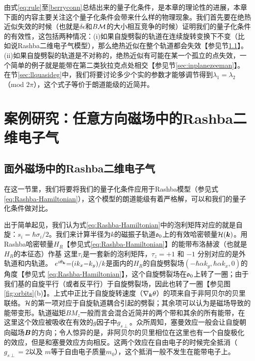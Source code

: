 由式\ref{eq:rule}至\ref{berryconn}总结出来的量子化条件，是本章的理论性的进展，本章下面的内容主要关注这个量子化条件会带来什么样的物理现象。我们首先要在绝热近似失效的时候（也就是$\delta \epsilon$和$B{\cal M}$的大小相互竞争的时候）证明我们的量子化条件的有效性，这包括两种情况：(i)如果自旋劈裂的轨道在连续旋转变换下不变（比如说Rashba二维电子气模型），那么绝热近似在整个轨道都会失效【参见节\ref{sec:Rashba}】。(ii)如果自旋劈裂的轨道是不对称的，绝热近似有可能在某一个孤立的点失效，一个简单的例子就是能带在第二类狄拉克点处相交【参见节\ref{sec:inplanezeeman}】。在节\ref{sec:llquasideg}中，我们将要讨论多少个实的参数才能够调节得到$\lambda_1{=}\lambda_2$（mod $2\pi$），这个式子等价于朗道能级的近简并。


\section{案例研究：任意方向磁场中的Rashba二维电子气}

\subsection{面外磁场中的Rashba二维电子气}\label{sec:Rashba}

在这一节里，我们将要将我们的量子化条件应用于Rashba模型（参见式\ref{eq:Rashba-Hamiltonian}），这个模型的朗道能级有着严格解，可以和我们的量子化条件做对比\cite{bychkov_oscillatory_1984}。

出于简单起见，我们认为式\ref{eq:Rashba-Hamiltonian}中的泡利矩阵对应的就是自旋：$s_i{=}\hbar \sigma_i/2$。我们来计算半径为$k$的磁振子轨道$\mathfrak{o}_0$上的有效哈密顿量${\cal H}(\boldsymbol{k})$。用Rashba哈密顿量$H_R$【参见式\ref{eq:Rashba-Hamiltonian}】的能带布洛赫波（也就是$H_R$的本征态）作基
这里$\tau_i$是一套新的泡利矩阵，$\tau_z{=}{+} 1$ 和 ${-}1$ 分别对应的是外轨道和内轨道。 $e^{i\theta_{\boldsymbol{k}}}{=}(ik_x{-}k_y)/k$是面内的$H_R$的自旋劈裂场$(-\hbar\alpha k_y,\hbar\alpha k_x,0)$的角度【参见式 \ref{eq:Rashba-Hamiltonian}】，这个自旋劈裂场在$\mathfrak{o}_0$上转了一圈；由于我们基的自旋平行（或者反平行）于自旋劈裂场，因此也转了一圈【参见图\ref{fig:orbits}(b)】。上式中正比于自旋旋转速度（$\nabla_{\boldsymbol{k}} \theta$）的项来自于非阿贝尔的贝里联络。${\cal H}$的第一项对应于自旋轨道耦合引起的劈裂；其余项可以认为是磁场导致的能带变形。轨道磁矩$B M_z$一般而言会混合近简并的两个带和其余的所有能带，在这里这个效应被吸收在有效的$g$因子中$g_{s\perp}$。众所周知，塞曼效应一般会让自旋朝向磁场$\boldsymbol{B}$的方向；令人惊异的是，非阿贝尔的贝里相位在这里也有一个自旋极化的效应，但是和塞曼效应方向相反。这两个效应在自由电子的时候完全抵消（$g_{s\perp}=2$以及 $m$等于自由电子质量$m_0$），这个抵消一般不发生在能带电子上。

